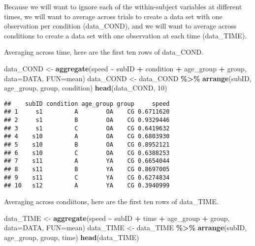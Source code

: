 \documentclass[]{article}
\newenvironment{Shaded}{\begin{snugshade}}{\end{snugshade}}
\newcommand{\DataTypeTok}[1]{\textcolor[rgb]{0.13,0.29,0.53}{#1}}
\newcommand{\DecValTok}[1]{\textcolor[rgb]{0.00,0.00,0.81}{#1}}
\newcommand{\KeywordTok}[1]{\textcolor[rgb]{0.13,0.29,0.53}{\textbf{#1}}}
\newcommand{\NormalTok}[1]{#1}
\newcommand{\OperatorTok}[1]{\textcolor[rgb]{0.81,0.36,0.00}{\textbf{#1}}}
\newcommand{\StringTok}[1]{\textcolor[rgb]{0.31,0.60,0.02}{#1}}
\begin{document}
Because we will want to ignore each of the within-subject variables at
different times, we will want to average across trials to create a data
set with one observation per condition (data\_COND), and we will want to
average across conditions to create a data set with one observation at
each time (data\_TIME).

Averaging across time, here are the first ten rows of data\_COND.

\begin{Shaded}
\begin{Highlighting}[]
\NormalTok{data\_COND <{-}}\StringTok{ }\KeywordTok{aggregate}\NormalTok{(speed }\OperatorTok{\textasciitilde{}}\StringTok{ }\NormalTok{subID }\OperatorTok{+}\StringTok{ }\NormalTok{condition }\OperatorTok{+}\StringTok{ }\NormalTok{age\_group }\OperatorTok{+}\StringTok{ }\NormalTok{group, }\DataTypeTok{data=}\NormalTok{DATA, }\DataTypeTok{FUN=}\NormalTok{mean)}
\NormalTok{data\_COND <{-}}\StringTok{ }\NormalTok{data\_COND }\OperatorTok{\%>\%}\StringTok{ }\KeywordTok{arrange}\NormalTok{(subID, age\_group, group, condition)}
\KeywordTok{head}\NormalTok{(data\_COND, }\DecValTok{10}\NormalTok{)}
\end{Highlighting}
\end{Shaded}

\begin{verbatim}
##    subID condition age_group group     speed
## 1     s1         A        OA    CG 0.6711620
## 2     s1         B        OA    CG 0.9329446
## 3     s1         C        OA    CG 0.6419632
## 4    s10         A        OA    CG 0.6803930
## 5    s10         B        OA    CG 0.8952121
## 6    s10         C        OA    CG 0.6388253
## 7    s11         A        YA    CG 0.6654044
## 8    s11         B        YA    CG 0.8697005
## 9    s11         C        YA    CG 0.6274834
## 10   s12         A        YA    CG 0.3940999
\end{verbatim}

Averaging across condiitons, here are the first ten rows of data\_TIME.

\begin{Shaded}
\begin{Highlighting}[]
\NormalTok{data\_TIME <{-}}\StringTok{ }\KeywordTok{aggregate}\NormalTok{(speed }\OperatorTok{\textasciitilde{}}\StringTok{ }\NormalTok{subID }\OperatorTok{+}\StringTok{ }\NormalTok{time }\OperatorTok{+}\StringTok{ }\NormalTok{age\_group }\OperatorTok{+}\StringTok{ }\NormalTok{group, }\DataTypeTok{data=}\NormalTok{DATA, }\DataTypeTok{FUN=}\NormalTok{mean)}
\NormalTok{data\_TIME <{-}}\StringTok{ }\NormalTok{data\_TIME }\OperatorTok{\%>\%}\StringTok{ }\KeywordTok{arrange}\NormalTok{(subID, age\_group, group, time)}
\KeywordTok{head}\NormalTok{(data\_TIME)}
\end{Highlighting}
\end{Shaded}
\end{document}
